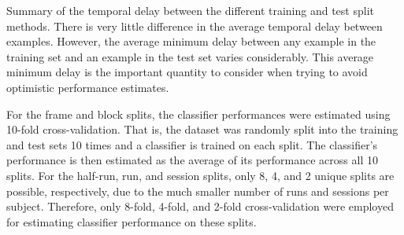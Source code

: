 \documentclass[preprint,5p,authoryear]{elsarticle}
\begin{document}
\begin{table}
\centering

\caption{Summary of the temporal delay between the different training and test split methods.
There is very little difference in the average temporal delay between examples.
However, the average minimum delay between any example in the training set and an example in the test set varies considerably.
This average minimum delay is the important quantity to consider when trying to avoid optimistic performance estimates.}
\label{tab:training-split}
\end{table}

For the frame and block splits, the classifier performances were estimated using 10-fold cross-validation.
That is, the dataset was randomly split into the training and test sets 10 times and a classifier is trained on each split.
The classifier's performance is then estimated as the average of its performance across all 10 splits.
For the half-run, run, and session splits, only 8, 4, and 2 unique splits are possible, respectively, due to the much smaller number of runs and sessions per subject. 
Therefore, only 8-fold, 4-fold, and 2-fold cross-validation were employed for estimating classifier performance on these splits.


\end{document}
